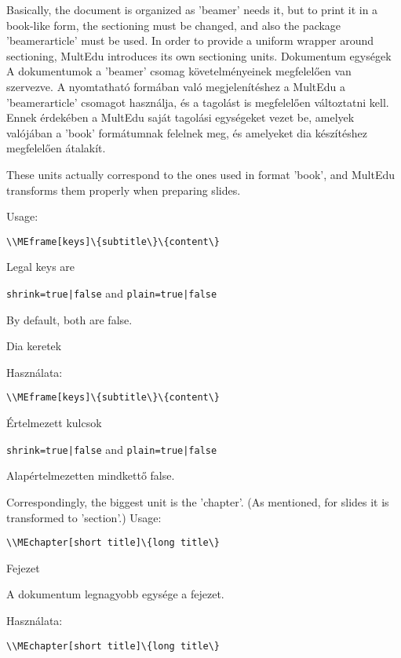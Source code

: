 



{
Basically, the document is organized as 'beamer' needs it,
but to print it in a book-like form, the sectioning must be changed,
and also the package 'beamerarticle' must be used.
In order to provide a uniform wrapper around sectioning, MultEdu introduces
its own sectioning units.
}
{Dokumentum egységek}
{
A dokumentumok a 'beamer' csomag követelményeinek megfelelően van szervezve.
A nyomtatható formában való megjelenítéshez a MultEdu  a 'beamerarticle' csomagot használja,
és a tagolást is megfelelően változtatni kell.
Ennek érdekében a MultEdu saját tagolási egységeket vezet be, amelyek valójában
a 'book' formátumnak felelnek meg, és amelyeket dia készítéshez megfelelően átalakít.
}

{
These units actually correspond to the ones used in format 'book',
and MultEdu transforms them properly when preparing slides.

Usage:\par
\noindent\lstinline|\\MEframe[keys]\{subtitle\}\{content\}|

Legal keys are 

\noindent\lstinline!shrink=true|false! and \lstinline!plain=true|false!

By default, both are false.
}
{Dia keretek}
{

Használata:\par
\noindent\lstinline|\\MEframe[keys]\{subtitle\}\{content\}|

Értelmezett kulcsok 

\noindent\lstinline!shrink=true|false! and \lstinline!plain=true|false!

Alapértelmezetten mindkettő false.
}


{
Correspondingly, the biggest unit is the 'chapter'.
(As mentioned, for slides it is transformed to 'section'.)
Usage:\par
\noindent\lstinline|\\MEchapter[short title]\{long title\}|

}
{Fejezet}
{

A dokumentum legnagyobb egysége a fejezet.

Használata:\par
\noindent\lstinline|\\MEchapter[short title]\{long title\}|

}

